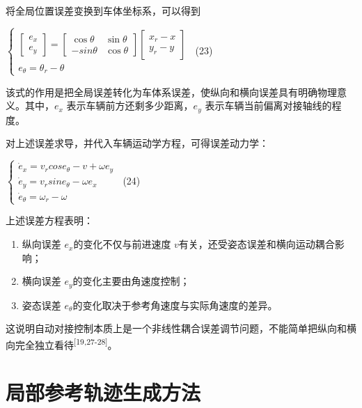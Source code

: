 将全局位置误差变换到车体坐标系，可以得到

\(\left\{ \begin{array}{r}
\left\lbrack \begin{array}{r}
e_{x} \\
e_{y}
\end{array} \right\rbrack = \begin{bmatrix}
\cos\theta & \sin\theta \\
 - sin\theta & \cos\theta
\end{bmatrix}\left\lbrack \begin{array}{r}
x_{r} - x \\
y_{r} - y
\end{array} \right\rbrack \\
e_{\theta} = \theta_{r} - \theta
\end{array} \right.\ \) (23)

该式的作用是把全局误差转化为车体系误差，使纵向和横向误差具有明确物理意义。其中，\(e_{x}\)
表示车辆前方还剩多少距离，\(e_{y}\) 表示车辆当前偏离对接轴线的程度。

对上述误差求导，并代入车辆运动学方程，可得误差动力学：

\(\left\{ \begin{array}{r}
{\dot{e}}_{x} = v_{r}cose_{\theta} - v + \omega e_{y} \\
{\dot{e}}_{y} = v_{r}sine_{\theta} - \omega e_{x} \\
{\dot{e}}_{\theta} = \omega_{r} - \omega
\end{array} \right.\ \) (24)

上述误差方程表明：

\begin{enumerate}
\def\labelenumi{\arabic{enumi}.}
\item
  纵向误差 \(e_{x}\)的变化不仅与前进速度
  \(v\)有关，还受姿态误差和横向运动耦合影响；
\item
  横向误差 \(e_{y}\)的变化主要由角速度控制；
\item
  姿态误差 \(e_{\theta}\)的变化取决于参考角速度与实际角速度的差异。
\end{enumerate}

这说明自动对接控制本质上是一个非线性耦合误差调节问题，不能简单把纵向和横向完全独立看待\textsuperscript{[19,27-28]}。

\section{局部参考轨迹生成方法}

